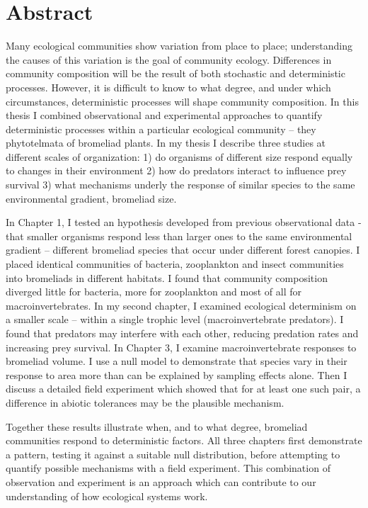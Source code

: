 \chapter*{Abstract}

Many ecological communities show variation from place to place; understanding the causes of this variation is the goal of community ecology. Differences in community composition will be the result of both stochastic and deterministic processes. However, it is difficult to know to what degree, and under which circumstances, deterministic processes will shape community composition. In this thesis I combined observational and experimental approaches to quantify deterministic processes within a particular ecological community -- they phytotelmata of bromeliad plants. In my thesis I describe three studies at different scales of organization: 1) do organisms of different size respond equally to changes in their environment 2) how do predators interact to influence prey survival 3) what mechanisms underly the response of similar species to the same environmental gradient, bromeliad size. 

In Chapter 1, I tested an hypothesis developed from previous observational data - that smaller organisms respond less than larger ones to the same environmental gradient -- different bromeliad species that occur under different forest canopies. I placed identical communities of bacteria, zooplankton and insect communities into bromeliads in different habitats. I found that community composition diverged little for bacteria, more for zooplankton and most of all for macroinvertebrates. In my second chapter, I examined ecological determinism on a smaller scale -- within a single trophic level (macroinvertebrate predators). I found that predators may interfere with each other, reducing predation rates and increasing prey survival. In Chapter 3, I examine macroinvertebrate responses to bromeliad volume. I use a null model to demonstrate that species vary in their response to area more than can be explained by sampling effects alone. Then I discuss a detailed field experiment which showed that for at least one such pair, a difference in abiotic tolerances may be the plausible mechanism. 

Together these results illustrate when, and to what degree, bromeliad communities respond to deterministic factors. All three chapters first demonstrate a pattern, testing it against a suitable null distribution, before attempting to quantify possible mechanisms with a field experiment. This combination of observation and experiment is an approach which can contribute to our understanding of how ecological systems work. 
